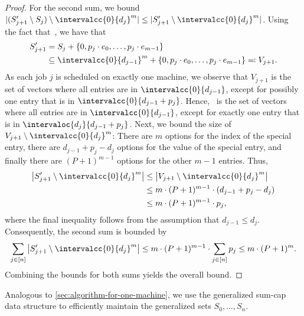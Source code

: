 \documentclass[10pt,a4paper]{article}
\DeclarePairedDelimiter\set{\lbrace}{\rbrace}
\begin{document}
\begin{proof}
    For the second sum, we bound $|(S'_{j+1} \setminus S_{j}) \setminus \intervalcc{0}{d_j}^m | \le |S_{j+1}' \setminus \intervalcc{0}{d_j}^m |$.
    Using the fact that~, we have that 
    \begin{align*}
        S_{j+1}' 
        &= S_{j} + \set{0, p_j \cdot e_0, \dots, p_j\cdot e_{m-1}} \\
        &\subseteq \intervalcc{0}{d_{j-1}}^m + \set{0, p_j \cdot e_0, \dots, p_j \cdot e_{m-1}} \eqqcolon V_{j+1}.
    \end{align*}
    As each job $j$ is scheduled on exactly one machine, we observe that $V_{j+1}$ is the set of vectors where all entries are in $\intervalcc{0}{d_{j-1}}$, except for possibly one entry that is in $\intervalcc{0}{d_{j-1} + p_j}$.
    Hence,~ is the set of vectors where all entries are in $\intervalcc{0}{d_{j-1}}$, except for exactly one entry that is in $\intervaloc{d_j}{d_{j-1} + p_j}$.
    Next, we bound the size of $V_{j+1} \setminus \intervalcc{0}{d_j}^m$: There are $m$ options for the index of the special entry, there are $d_{j-1} + p_j - d_j$ options for the value of the special entry, and finally there are $(P+1)^{m-1}$ options for the other $m-1$ entries.
    Thus, 
    \begin{align*}
        \big|S_{j+1}' \setminus \intervalcc{0}{d_j}^m \big|
        &\le \big| V_{j+1} \setminus  \intervalcc{0}{d_j}^m \big| \\
        &\le m \cdot (P+1)^{m-1} \cdot (d_{j-1} + p_j - d_j) \\
        &\le m \cdot (P+1)^{m-1} \cdot p_j,
    \end{align*}
    where the final inequality follows from the assumption that $d_{j-1} \le d_j$.
    Consequently, the second sum is bounded by
    \[
        \sum_{j\in[n]} \big|S_{j+1}' \setminus \intervalcc{0}{d_j}^m \big| \le m\cdot(P+1)^{m-1} \cdot \sum_{j\in[n]} p_j \leq m \cdot (P+1)^m.
    \]
    Combining the bounds for both sums yields the overall bound.
\end{proof} 

Analogous to \cref{sec:algorithm-for-one-machine}, we use the generalized sum-cap data structure to efficiently maintain the generalized sets $S_0, \dots, S_n$.
\end{document}
